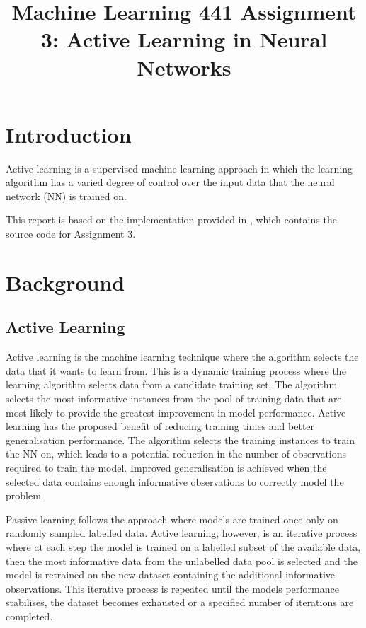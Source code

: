 \documentclass[conference]{IEEEtran}
\begin{document}
	
	\title{Machine Learning 441 Assignment 3: Active Learning in Neural Networks}
	\author{
	}
	\maketitle
	
	\begin{abstract}
	
	\end{abstract}
	
	\section{Introduction}
	Active learning is a supervised machine learning approach in which the learning algorithm has a varied degree of control over the input data that the neural network (NN) is trained on. 

	This report is based on the implementation provided in \cite{github}, which contains the source code for Assignment 3.

	\section{Background}\label{B}
	\subsection{Active Learning}
	Active learning is the machine learning technique where the algorithm selects the data that it wants to learn from. This is a dynamic training process where the learning algorithm selects data from a candidate training set. The algorithm selects the most informative instances from the pool of training data that are most likely to provide the greatest improvement in model performance. Active learning has the proposed benefit of reducing training times and better generalisation performance. The algorithm selects the training instances to train the NN on, which leads to a potential reduction in the number of observations required to train the model. Improved generalisation is achieved when the selected data contains enough informative observations to correctly model the problem.
	
	Passive learning follows the approach where models are trained once only on randomly sampled labelled data. Active learning, however, is an iterative process where at each step the model is trained on a labelled subset of the available data, then the most informative data from the unlabelled data pool is selected and the model is retrained on the new dataset containing the additional informative observations. This iterative process is repeated until the models performance stabilises, the dataset becomes exhausted or a specified number of iterations are completed.
	
\end{document}
